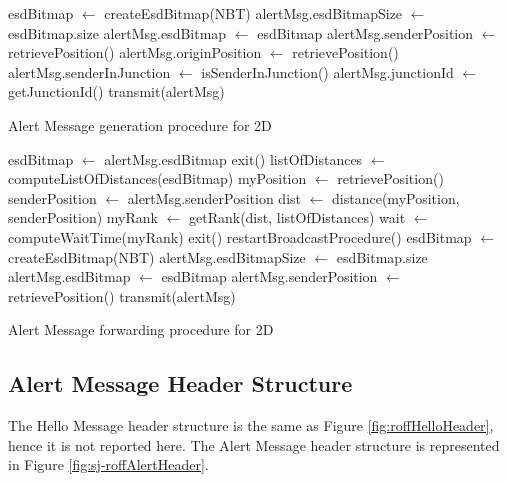 		\begin{algorithm}[H]
			\begin{algorithmic}[1]
				\State esdBitmap $\gets$ createEsdBitmap(NBT)
				\State alertMsg.esdBitmapSize $\gets$ esdBitmap.size
				\State alertMsg.esdBitmap $\gets$ esdBitmap
				\State alertMsg.senderPosition $\gets$ retrievePosition()
				\State alertMsg.originPosition $\gets$ retrievePosition()
				\State alertMsg.senderInJunction $\gets$ isSenderInJunction()
				\State alertMsg.junctionId $\gets$ getJunctionId()
				\State transmit(alertMsg)
			\end{algorithmic}
			\caption{Alert Message generation procedure for 2D}
			\label{alg:sj-roff-alert-message-generation}
		\end{algorithm}
		
		\begin{algorithm}[H]
			\begin{algorithmic}[1]
				\State esdBitmap $\gets$ alertMsg.esdBitmap
				\State exit()
				\Else
				\State listOfDistances $\gets$ computeListOfDistances(esdBitmap)
				\State myPosition $\gets$ retrievePosition()
				\State senderPosition $\gets$ alertMsg.senderPosition
				\State dist $\gets$ distance(myPosition, senderPosition)
				\State myRank $\gets$ getRank(dist, listOfDistances)
				\State wait $\gets$ computeWaitTime(myRank)
				\State exit()
				\State restartBroadcastProcedure()
				\Else
				\State esdBitmap $\gets$ createEsdBitmap(NBT)
				\State alertMsg.esdBitmapSize $\gets$ esdBitmap.size
				\State alertMsg.esdBitmap $\gets$ esdBitmap
				\State alertMsg.senderPosition $\gets$ retrievePosition()
				\State transmit(alertMsg)
				\EndIf 
				\EndIf
			\end{algorithmic}
			\caption{Alert Message forwarding procedure for 2D}
			\label{alg:sj-roff-alert-message-forwarding}
		\end{algorithm}
	
		\subsection{Alert Message Header Structure}
			The Hello Message header structure is the same as Figure \ref{fig:roffHelloHeader}, hence it is not reported here. The Alert Message header structure is represented in Figure \ref{fig:sj-roffAlertHeader}.
		
